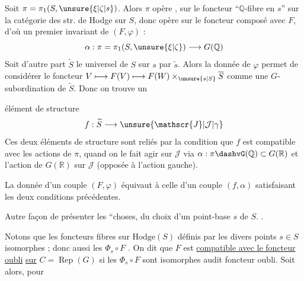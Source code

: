 Soit $\pi=\pi_1(S,\unsure{\xi|\zeta|s})$. Alors $\pi$ opère , sur le foncteur  ``$\mathbb{Q}$-fibre en $s$'' sur la catégorie des str. de Hodge sur $S$, donc opère sur le foncteur composé avec $F$, d'où un premier invariant de $(F,\varphi)$ :
\[
\alpha:\pi=\pi_1(S,\unsure{\xi|\zeta})\longrightarrow G(\mathbb{Q})
\]
Soit d'autre part $\widetilde{S}$ le  universel de $S$   sur $s$ par $\widetilde{s}$. Alors la donnée de $\varphi$ permet de considérer le foncteur $V\longmapsto F(V)\longmapsto F(W)\times_{\unsure{s|S}}\overline{S}$ comme une $G$-subordination de $\widetilde{S}$. Donc on trouve un



 élément de structure
\[
f:\widetilde{S}\longrightarrow\unsure{\mathscr{J}|\mathcal{J}|\gamma}
\]
Ces deux éléments de structure sont reliés par la condition que $f$ est compatible avec les actions de $\pi$, quand on le fait agir sur $\mathscr{J}$ via $\alpha:\pi\dashvG(\mathbb{Q})\subset G(\mathbb{R})$ et l'action  de $G(\mathbb{R})$ sur $\mathscr{J}$ (opposée à l'action gauche).

La donnée d'un couple $(F,\varphi)$ équivaut à celle d'un couple $(f,\alpha)$ satisfaisant les deux conditions précédentes.


Autre façon de présenter les ``choses,  du choix d'un point-base $s$ de $S$. .

 Notons que les foncteurs fibres  sur  $\mathrm{Hodge}(S)$ définis par les divers points $s\in S$   isomorphes ; donc aussi les $\Phi_s\circ F$ . On dit que  $F$ est \uline{compatible avec le foncteur} \uline{oubli} \uline{sur} $C=\operatorname{Rep}(G)$ si les $\Phi_s\circ F$ sont isomorphes audit foncteur oubli. Soit alors, pour



